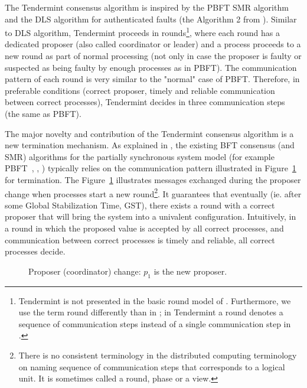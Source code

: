 The Tendermint consensus algorithm is inspired by the PBFT SMR
algorithm~\cite{CL99:osdi} and the DLS algorithm for authenticated faults (the
Algorithm 2 from \cite{DLS88:jacm}). Similar to DLS algorithm, Tendermint
proceeds in
rounds\footnote{Tendermint is not presented in the basic round model of
	\cite{DLS88:jacm}. Furthermore, we use the term round differently than in
	\cite{DLS88:jacm}; in Tendermint a round denotes a sequence of communication
	steps instead of a single communication step in \cite{DLS88:jacm}.}, where each
round has a dedicated proposer (also called coordinator or
leader) and a process proceeds to a new round as part of normal
processing (not only in case the proposer is faulty or suspected as being faulty
by enough processes as in PBFT).  
The communication pattern of each round is very similar to the "normal" case
of PBFT. Therefore, in preferable conditions (correct proposer, timely and
reliable communication between correct processes), Tendermint decides in three
communication steps (the same as PBFT). 

The major novelty and contribution of the Tendermint consensus algorithm is a
new termination mechanism. As explained in \cite{MHS09:opodis, RMS10:dsn}, the
existing BFT consensus (and SMR) algorithms for the partially synchronous
system model (for example PBFT~\cite{CL99:osdi}, \cite{DLS88:jacm},
\cite{MA06:tdsc}) typically relies on the communication pattern illustrated in
Figure~\ref{ch3:fig:coordinator-change} for termination. The
Figure~\ref{ch3:fig:coordinator-change} illustrates messages exchanged during
the proposer change when processes start a new round\footnote{There is no
	consistent terminology in the distributed computing terminology on naming
	sequence of communication steps that corresponds to a logical unit. It is
	sometimes called a round, phase or a view.}. It guarantees that eventually (ie.
after some Global Stabilization Time, GST), there exists a round with a correct
proposer that will bring the system into a univalent configuration.
Intuitively, in a round in which the proposed value is accepted
by all correct processes, and communication between correct processes is
timely and reliable, all correct processes decide.   


\begin{figure}[tbh!] \def\rdstretch{5} \def\ystretch{3} \centering
	\begin{rounddiag}{4}{2}  
		  
		 
		   \end{rounddiag}
	\vspace{-5mm} \caption{\boldmath Proposer (coordinator) change: $p_1$ is the
		new proposer.} \label{ch3:fig:coordinator-change} \end{figure}  

